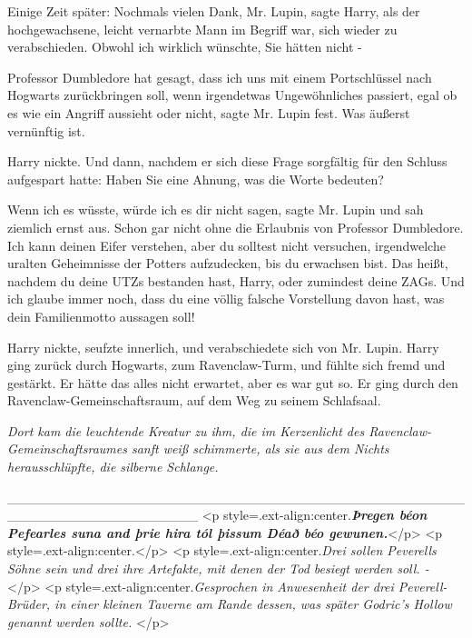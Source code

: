 Einige Zeit später: \glqq Nochmals vielen Dank, Mr. Lupin\grqq{}, sagte Harry,
als der hochgewachsene, leicht vernarbte Mann im Begriff war, sich wieder zu
verabschieden. \glqq Obwohl ich wirklich wünschte, Sie hätten nicht -\grqq{}

\glqq Professor Dumbledore hat gesagt, dass ich uns mit einem Portschlüssel nach
Hogwarts zurückbringen soll, wenn irgendetwas Ungewöhnliches passiert, egal ob
es wie ein Angriff aussieht oder nicht\grqq{}, sagte Mr. Lupin fest. \glqq Was
äußerst vernünftig ist.\grqq{}

Harry nickte. Und dann, nachdem er sich diese Frage sorgfältig für den Schluss
aufgespart hatte: \glqq Haben Sie eine Ahnung, was die Worte bedeuten?\grqq{}

\glqq Wenn ich es wüsste, würde ich es dir nicht sagen\grqq{}, sagte Mr. Lupin
und sah ziemlich ernst aus. \glqq Schon gar nicht ohne die Erlaubnis von
Professor Dumbledore. Ich kann deinen Eifer verstehen, aber du solltest nicht
versuchen, irgendwelche uralten Geheimnisse der Potters aufzudecken, bis du
erwachsen bist. Das heißt, nachdem du deine UTZs bestanden hast, Harry, oder
zumindest deine ZAGs. Und ich glaube immer noch, dass du eine völlig falsche
Vorstellung davon hast, was dein Familienmotto aussagen soll!\grqq{}

Harry nickte, seufzte innerlich, und verabschiedete sich von Mr. Lupin. Harry
ging zurück durch Hogwarts, zum Ravenclaw-Turm, und fühlte sich fremd und
gestärkt. Er hätte das alles nicht erwartet, aber es war gut so. Er ging durch
den Ravenclaw-Gemeinschaftsraum, auf dem Weg zu seinem Schlafsaal.

\emph{Dort kam die leuchtende Kreatur zu ihm, die im Kerzenlicht des Ravenclaw-Gemeinschaftsraumes sanft weiß schimmerte, als sie aus dem Nichts herausschlüpfte, die silberne Schlange. }

____________________________________________________________________ <p
style=\grqq{}.ext-align:center\grqq{}.\emph{\textbf{\emph{Þregen béon Pefearles
suna and þrie hira tól þissum Déað béo gewunen.}}}</p>\textbf{\emph{ }} <p
style=\grqq{}.ext-align:center\grqq{}.</p> <p
style=\grqq{}.ext-align:center\grqq{}.\emph{Drei sollen Peverells Söhne sein und
drei ihre Artefakte, mit denen der Tod besiegt werden soll. - }</p> <p
style=\grqq{}.ext-align:center\grqq{}.\emph{Gesprochen in Anwesenheit der drei
Peverell-Brüder, in einer kleinen Taverne am Rande dessen, was später Godric's
Hollow genannt werden sollte. }</p>

